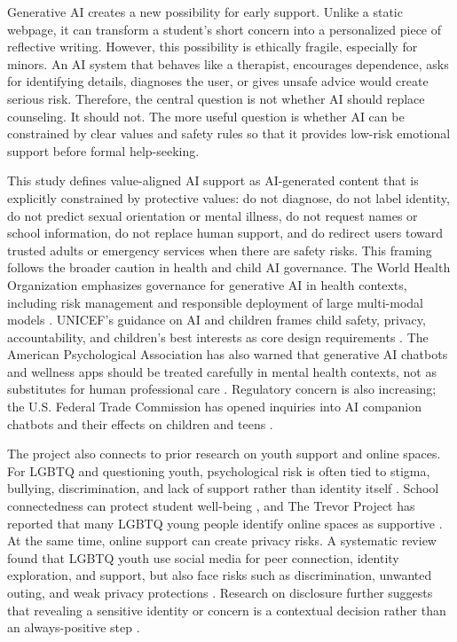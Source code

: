 Generative AI creates a new possibility for early support. Unlike a static webpage, it can transform a student's short concern into a personalized piece of reflective writing. However, this possibility is ethically fragile, especially for minors. An AI system that behaves like a therapist, encourages dependence, asks for identifying details, diagnoses the user, or gives unsafe advice would create serious risk. Therefore, the central question is not whether AI should replace counseling. It should not. The more useful question is whether AI can be constrained by clear values and safety rules so that it provides low-risk emotional support before formal help-seeking.

This study defines value-aligned AI support as AI-generated content that is explicitly constrained by protective values: do not diagnose, do not label identity, do not predict sexual orientation or mental illness, do not request names or school information, do not replace human support, and do redirect users toward trusted adults or emergency services when there are safety risks. This framing follows the broader caution in health and child AI governance. The World Health Organization emphasizes governance for generative AI in health contexts, including risk management and responsible deployment of large multi-modal models \parencite{who2024}. UNICEF's guidance on AI and children frames child safety, privacy, accountability, and children's best interests as core design requirements \parencite{unicef2025}. The American Psychological Association has also warned that generative AI chatbots and wellness apps should be treated carefully in mental health contexts, not as substitutes for human professional care \parencite{apa_ai2025}. Regulatory concern is also increasing; the U.S. Federal Trade Commission has opened inquiries into AI companion chatbots and their effects on children and teens \parencite{ftc2025}.

The project also connects to prior research on youth support and online spaces. For LGBTQ and questioning youth, psychological risk is often tied to stigma, bullying, discrimination, and lack of support rather than identity itself \parencite{apa_nodate, cdc_yrbs2024, glsen2022}. School connectedness can protect student well-being \parencite{cdc_connectedness2024}, and The Trevor Project has reported that many LGBTQ young people identify online spaces as supportive \parencite{trevor2025_survey}. At the same time, online support can create privacy risks. A systematic review found that LGBTQ youth use social media for peer connection, identity exploration, and support, but also face risks such as discrimination, unwanted outing, and weak privacy protections \parencite{berger2022}. Research on disclosure further suggests that revealing a sensitive identity or concern is a contextual decision rather than an always-positive step \parencite{chaudoir2010}.


